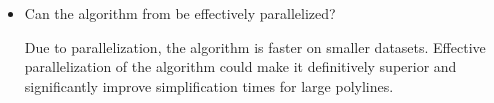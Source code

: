 \begin{itemize}
	\item Can the algorithm from \citeauthor{polyline_simplification_has_cubic_complexity_bringmannetal} be effectively parallelized?

	Due to parallelization, the \citeauthor{on_optimal_polyline_simplification_using_the_hausdorff_and_frechet_distance} algorithm is faster on smaller datasets. Effective parallelization of the \citeauthor{polyline_simplification_has_cubic_complexity_bringmannetal} algorithm could make it definitively superior and significantly improve simplification times for large polylines.
\end{itemize}
